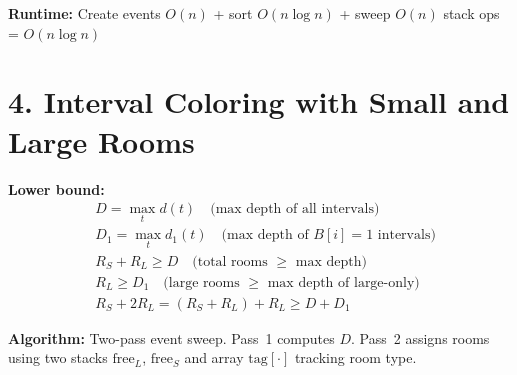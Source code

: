 \documentclass[11pt]{article}
\begin{document}
\textbf{Runtime:} Create events $O(n)$ + sort $O(n \log n)$ + sweep $O(n)$ stack ops = $\boxed{O(n \log n)}$

\section*{4. Interval Coloring with Small and Large Rooms}

\textbf{Lower bound:}
\begin{align*}
&D = \max_t d(t) \quad \text{(max depth of all intervals)} \\
&D_1 = \max_t d_1(t) \quad \text{(max depth of } B[i]=1 \text{ intervals)} \\
&R_S + R_L \ge D \quad \text{(total rooms } \ge \text{ max depth)} \\
&R_L \ge D_1 \quad \text{(large rooms } \ge \text{ max depth of large-only)} \\
&R_S + 2R_L = (R_S + R_L) + R_L \ge D + D_1
\end{align*}

\textbf{Algorithm:} Two-pass event sweep. Pass~1 computes $D$. Pass~2 assigns rooms using two stacks
$\mathrm{free}_L$, $\mathrm{free}_S$ and array $\mathrm{tag}[\cdot]$ tracking room type.
\end{document}
